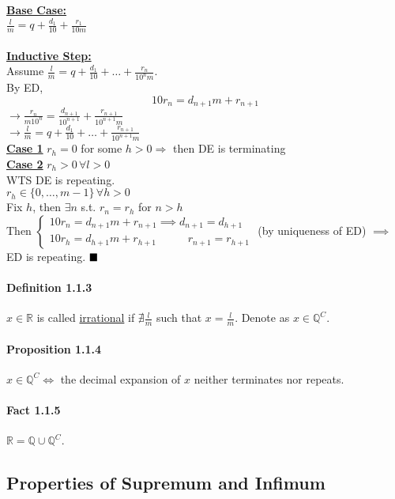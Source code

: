 \documentclass[11pt]{article}
\newcommand{\real}[0]{\mathbb{R}}
\newcommand{\under}[1]{\underline{#1}}
\newcommand{\rational}[0]{\mathbb{Q}}
\newcommand{\qed}[0]{$\hfill\blacksquare$}
\begin{document}
\textbf{\under{Base Case:}} \\
$\frac{l}{m} = q + \frac{d_1}{10} + \frac{r_1}{10m}$ \\\\
\textbf{\under{Inductive Step:}} \\
Assume $\frac{l}{m} = q + \frac{d_1}{10} + \hdots + \frac{r_n}{10^nm}$. \\
By ED, $$10r_n = d_{n+1} m + r_{n+1}$$
$\rightarrow \frac{r_n}{m10^n} = \frac{d_{n+1}}{10^{n+1}} + \frac{r_{n+1}}{10^{n+1}m}$ \\
$\rightarrow \frac{l}{m} = q + \frac{d_1}{10} + \hdots + \frac{r_{n+1}}{10^{n+1}m}$ \\
\textbf{\under{Case 1}} $r_h = 0$ for some $h > 0 \Rightarrow$ then DE is terminating \\
\textbf{\under{Case 2}} $r_h > 0 \, \forall l > 0$ \\
WTS DE is repeating. \\
$r_h \in \{0, \hdots, m-1\} \, \forall h > 0$ \\
Fix $h$, then $\exists n$ s.t. $r_n = r_h$ for $n > h$ \\
Then
$\begin{cases}
	10 r_n = d_{n+1}m + r_{n+1} \implies d_{n+1} = d_{h+1}\\
	10 r_h = d_{h+1}m + r_{h+1} \quad\quad\,\,\,\,\, r_{n+1} = r_{h+1}
\end{cases}$
(by uniqueness of ED)
$\implies$ ED is repeating. \qed
\paragraph{Definition 1.1.3} $x \in \real$ is called \under{irrational} if $\nexists \frac{l}{m}$ such that $x = \frac{l}{m}$. Denote as $x \in \rational^C$.
\paragraph{Proposition 1.1.4} $x \in \rational^C \iff$ the decimal expansion of $x$ neither terminates nor repeats.
\paragraph{Fact 1.1.5} $\real = \rational \cup \rational^C$.
\subsection{Properties of Supremum and Infimum}
\end{document}

